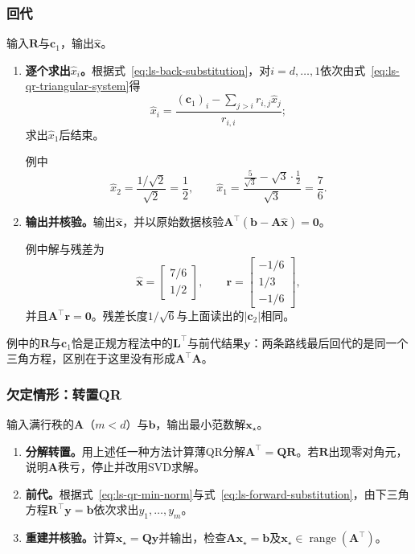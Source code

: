 \subsubsection{回代}
输入$\bm R$与$\bm c_1$，输出$\hat{\bm x}$。
\begin{enumerate}
 \item \textbf{逐个求出$\hat x_i$。}根据式~\eqref{eq:ls-back-substitution}，对$i=d,\ldots,1$依次由式~\eqref{eq:ls-qr-triangular-system}得
 \[
  \hat x_i=\frac{(\bm c_1)_i-\sum_{j>i}r_{i,j}\hat x_j}{r_{i,i}} ;
 \]
 求出$\hat x_1$后结束。
 
 例中
 \[
  \hat x_2=\frac{1/\sqrt2}{\sqrt2}=\frac12,\qquad
  \hat x_1=\frac{\frac5{\sqrt3}-\sqrt3\cdot\frac12}{\sqrt3}=\frac76 .
 \]

 \item \textbf{输出并核验。}输出$\hat{\bm x}$，并以原始数据核验$\bm A^\top(\bm b-\bm A\hat{\bm x})=\bm0$。
 
 例中解与残差为
 \[
  \hat{\bm x}=\begin{bmatrix}7/6\\1/2\end{bmatrix},\qquad
  \bm r=\begin{bmatrix}-1/6\\1/3\\-1/6\end{bmatrix},
 \]
 并且$\bm A^\top\bm r=\bm0$。残差长度$1/\sqrt6$与上面读出的$\lvert\bm c_2\rvert$相同。
\end{enumerate}

例中的$\bm R$与$\bm c_1$恰是正规方程法中的$\bm L^\top$与前代结果$\bm y$：两条路线最后回代的是同一个三角方程，区别在于这里没有形成$\bm A^\top\bm A$。

\subsubsection{欠定情形：转置QR}
输入满行秩的$\bm A$（$m<d$）与$\bm b$，输出最小范数解$\bm x_\star$。
\begin{enumerate}
 \item \textbf{分解转置。}用上述任一种方法计算薄QR分解$\bm A^\top=\bm Q\bm R$。若$\bm R$出现零对角元，说明$\bm A$秩亏，停止并改用SVD求解。
 \item \textbf{前代。}根据式~\eqref{eq:ls-qr-min-norm}与式~\eqref{eq:ls-forward-substitution}，由下三角方程$\bm R^\top\bm y=\bm b$依次求出$y_1,\ldots,y_m$。
 \item \textbf{重建并核验。}计算$\bm x_\star=\bm Q\bm y$并输出，检查$\bm A\bm x_\star=\bm b$及$\bm x_\star\in\operatorname{range}(\bm A^\top)$。
\end{enumerate}

